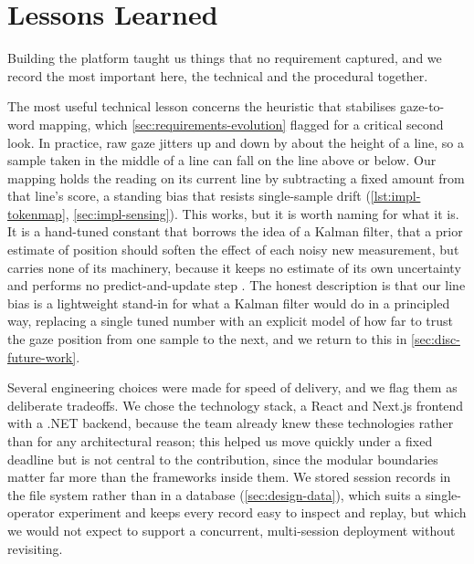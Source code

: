 \section{Lessons Learned}
\label{sec:disc-lessons}

Building the platform taught us things that no requirement captured, and we record the most important here, the technical and the procedural together.

The most useful technical lesson concerns the heuristic that stabilises gaze-to-word mapping, which \cref{sec:requirements-evolution} flagged for a critical second look.
In practice, raw gaze jitters up and down by about the height of a line, so a sample taken in the middle of a line can fall on the line above or below.
Our mapping holds the reading on its current line by subtracting a fixed amount from that line's score, a standing bias that resists single-sample drift (\cref{lst:impl-tokenmap}, \cref{sec:impl-sensing}).
This works, but it is worth naming for what it is.
It is a hand-tuned constant that borrows the idea of a Kalman filter, that a prior estimate of position should soften the effect of each noisy new measurement, but carries none of its machinery, because it keeps no estimate of its own uncertainty and performs no predict-and-update step \cite{kalman1960filtering}.
The honest description is that our line bias is a lightweight stand-in for what a Kalman filter would do in a principled way, replacing a single tuned number with an explicit model of how far to trust the gaze position from one sample to the next, and we return to this in \cref{sec:disc-future-work}.

Several engineering choices were made for speed of delivery, and we flag them as deliberate tradeoffs.
We chose the technology stack, a React and Next.js frontend with a .NET backend, because the team already knew these technologies rather than for any architectural reason; this helped us move quickly under a fixed deadline but is not central to the contribution, since the modular boundaries matter far more than the frameworks inside them.
We stored session records in the file system rather than in a database (\cref{sec:design-data}), which suits a single-operator experiment and keeps every record easy to inspect and replay, but which we would not expect to support a concurrent, multi-session deployment without revisiting.

